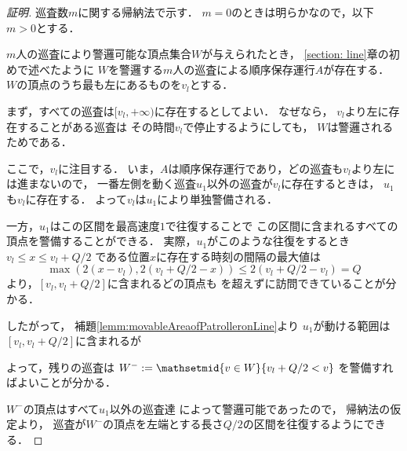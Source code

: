 \begin{proof}[証明]

	\newcommand{\leftmostpoint}{v_l}
	\newcommand{\leftmostpatroller}{u_1}

	巡査数$m$に関する帰納法で示す．
	$m = 0$のときは明らかなので，以下$m > 0$とする．

	$m$人の巡査により警邏可能な頂点集合$W$が与えられたとき，
	\ref{section: line}章の初めで述べたように
	$W$を警邏する$m$人の巡査による順序保存運行$A$が存在する．
	$W$の頂点のうち最も左にあるものを$\leftmostpoint$とする．

	まず，すべての巡査は$[\leftmostpoint, +\infty)$に存在するとしてよい．
	なぜなら，
	$\leftmostpoint$より左に存在することがある巡査は
	その時間$\leftmostpoint$で停止するようにしても，
	$W$は警邏されるためである．

	ここで，$\leftmostpoint$に注目する．
	いま，$A$は順序保存運行であり，どの巡査も$\leftmostpoint$より左には進まないので，
	一番左側を動く巡査$\leftmostpatroller$以外の巡査が$\leftmostpoint$に存在するときは，
	$\leftmostpatroller$も$\leftmostpoint$に存在する．
	よって$\leftmostpoint$は$\leftmostpatroller$により単独警備される．

	一方，$\leftmostpatroller$はこの区間を最高速度$1$で往復することで
	この区間に含まれるすべての頂点を警備することができる．
	実際，$\leftmostpatroller$がこのような往復をするとき
	$\leftmostpoint \leq x \leq \leftmostpoint + Q/2$
	である位置$x$に存在する時刻の間隔の最大値は
	\[
		\max( 2(x - \leftmostpoint), 2(\leftmostpoint + Q/2 - x) )
		\leq 2(\leftmostpoint + Q/2 - \leftmostpoint) = Q
	\]
	より，$[\leftmostpoint, \leftmostpoint + Q/2]$に含まれるどの頂点も
	{\idletime}を超えずに訪問できていることが分かる．

	したがって，
	補題\ref{lemm:movableAreaofPatrolleronLine}より
	$\leftmostpatroller$が動ける範囲は
	$[\leftmostpoint, \leftmostpoint + Q/2]$に含まれるが
	
	よって，残りの巡査は
	$W ^- := \mathsetmid{ v \in W }{ \leftmostpoint + Q/2 < v }$
	を警備すればよいことが分かる．

	$W ^-$の頂点はすべて$\leftmostpatroller$以外の巡査達
	によって警邏可能であったので，
	帰納法の仮定より，
	巡査が$W ^-$の頂点を左端とする長さ$Q / 2$の区間を往復するようにできる．
\end{proof}

